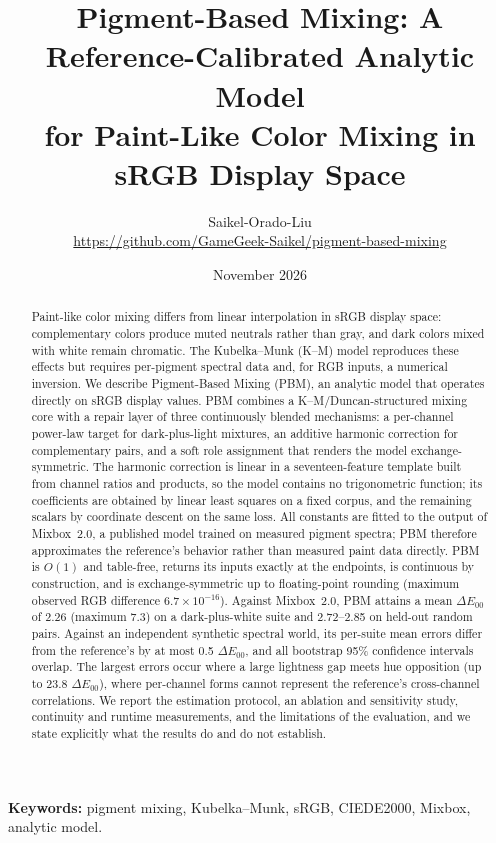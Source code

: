 \documentclass[11pt,a4paper]{article}
\title{\bfseries Pigment-Based Mixing: A Reference-Calibrated Analytic Model\\ for Paint-Like Color Mixing in sRGB Display Space}
\author{Saikel-Orado-Liu\\[2pt]
\small \url{https://github.com/GameGeek-Saikel/pigment-based-mixing}}
\date{November 2026}
\begin{document}
\maketitle

\begin{abstract}
\noindent
Paint-like color mixing differs from linear interpolation in sRGB display space: complementary colors produce muted neutrals rather than gray, and dark colors mixed with white remain chromatic. The Kubelka--Munk (K--M) model reproduces these effects but requires per-pigment spectral data and, for RGB inputs, a numerical inversion. We describe Pigment-Based Mixing (PBM), an analytic model that operates directly on sRGB display values. PBM combines a K--M/Duncan-structured mixing core with a repair layer of three continuously blended mechanisms: a per-channel power-law target for dark-plus-light mixtures, an additive harmonic correction for complementary pairs, and a soft role assignment that renders the model exchange-symmetric. The harmonic correction is linear in a seventeen-feature template built from channel ratios and products, so the model contains no trigonometric function; its coefficients are obtained by linear least squares on a fixed corpus, and the remaining scalars by coordinate descent on the same loss. All constants are fitted to the output of Mixbox~2.0, a published model trained on measured pigment spectra; PBM therefore approximates the reference's behavior rather than measured paint data directly. PBM is $O(1)$ and table-free, returns its inputs exactly at the endpoints, is continuous by construction, and is exchange-symmetric up to floating-point rounding (maximum observed RGB difference $6.7\times10^{-16}$). Against Mixbox~2.0, PBM attains a mean $\Delta E_{00}$ of 2.26 (maximum 7.3) on a dark-plus-white suite and 2.72--2.85 on held-out random pairs. Against an independent synthetic spectral world, its per-suite mean errors differ from the reference's by at most 0.5 $\Delta E_{00}$, and all bootstrap 95\% confidence intervals overlap. The largest errors occur where a large lightness gap meets hue opposition (up to 23.8 $\Delta E_{00}$), where per-channel forms cannot represent the reference's cross-channel correlations. We report the estimation protocol, an ablation and sensitivity study, continuity and runtime measurements, and the limitations of the evaluation, and we state explicitly what the results do and do not establish.
\end{abstract}

\noindent\textbf{Keywords:} pigment mixing, Kubelka--Munk, sRGB, CIEDE2000, Mixbox, analytic model.
\end{document}
